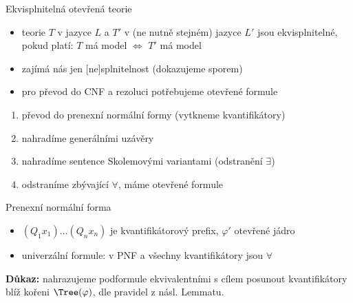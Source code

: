 \documentclass{beamer}
\begin{document}
\begin{frame}{Ekvisplnitelná otevřená teorie}

    \begin{itemize}
        \item teorie $T$ v jazyce $L$ a $T'$ v (ne nutně stejném) jazyce $L'$ jsou  \alert{ekvisplnitelné}, pokud platí: $T$ má model $\Leftrightarrow$ $T'$ má model \pause
        \item zajímá nás jen [ne]splnitelnost (dokazujeme sporem)\pause
        \item pro převod do CNF a rezoluci potřebujeme otevřené formule\pause 
    \end{itemize}


    \pause
    \begin{enumerate}
        \item převod do \alert{prenexní normální formy} (vytkneme kvantifikátory)\pause
        \item nahradíme generálními uzávěry \pause
        \item nahradíme sentence \alert{Skolemovými variantami} (odstranění $\exists$)\pause
        \item odstraníme zbývající $\forall$, máme otevřené formule
    \end{enumerate}

\end{frame}


\begin{frame}{Prenexní normální forma}

    \pause

    \pause
    \begin{itemize}
        \item $(Q_1x_1)\dots(Q_nx_n)$ je \alert{kvantifikátorový prefix}, $\varphi'$ \alert{otevřené jádro}\pause
        \item \alert{univerzální} formule: v PNF a všechny kvantifikátory jsou $\forall$
    \end{itemize}

    \pause
    
    \pause
    \textbf{Důkaz:} nahrazujeme podformule ekvivalentními s cílem posunout kvantifikátory blíž kořeni $\Tree(\varphi)$, dle pravidel z násl. Lemmatu.\hfill\qedsymbol

    \pause

\end{frame}
\end{document}

